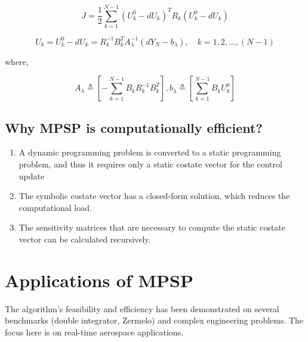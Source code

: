 \documentclass[12pt]{article}
\begin{document}
\begin{equation}J=\frac{1}{2} \sum_{k=1}^{N-1}\left(U_{k}^{0}-d U_{k}\right)^{T} R_{k}\left(U_{k}^{0}-d U_{k}\right)
\label{eq:CostFunction}
\end{equation}

\begin{equation}U_{k}=U_{k}^{0}-d U_{k}=R_{k}^{-1} B_{k}^{T} A_{\lambda}^{-1}\left(d Y_{N}-b_{\lambda}\right), \quad k=1,2, \ldots,(N-1)
\label{eq:UpdateEquation}
\end{equation}

where,

\begin{equation}A_{\lambda} \triangleq\left[-\sum_{k=1}^{N-1} B_{k} R_{k}^{-1} B_{k}^{T}\right], b_{\lambda} \triangleq\left[\sum_{k=1}^{N-1} B_{k} U_{k}^{0}\right]
\end{equation}

\subsection{Why MPSP is computationally efficient?}
\begin{enumerate}
	\item A dynamic programming problem is converted to a static programming problem, and thus it requires only a static costate vector for the control update
	\item The symbolic costate vector has a closed-form solution, which reduces the computational load.
	\item The sensitivity matrices that are necessary to compute the static costate vector can be calculated recursively.
\end{enumerate}

\section{Applications of MPSP}
The algorithm's feasibility and efficiency has been demonstrated on several benchmarks (double integrator, Zermelo) and complex engineering problems. The focus here is on real-time aerospace applications.
\end{document}

